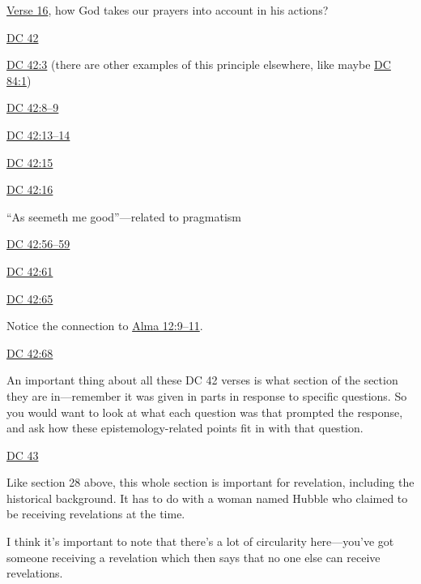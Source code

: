 \begin{compactdesc}
\begin{compactitem}
					\item \hyperref[DC39-16]{Verse 16}, how God takes our prayers into account in his actions?
				\end{compactitem}
			\item \hyperref[DC42]{DC 42}
				\begin{compactitem}
					\item \hyperref[DC42-3]{DC 42:3} (there are other examples of this principle elsewhere, like maybe \hyperref[DC84-1]{DC 84:1})
					\item \hyperref[DC42-8]{DC 42:8--9}
					\item \hyperref[DC42-13]{DC 42:13--14}
					\item \hyperref[DC42-15]{DC 42:15}
					\item \hyperref[DC42-16]{DC 42:16}
						\begin{compactitem}
							\item ``As seemeth me good''---related to pragmatism
						\end{compactitem}
					\item \hyperref[DC42-56]{DC 42:56--59}
					\item \hyperref[DC42-61]{DC 42:61}
					\item \hyperref[DC42-65]{DC 42:65}
						\begin{compactitem}
							\item Notice the connection to \hyperref[ALMA-12-9]{Alma 12:9--11}.
						\end{compactitem}
					\item \hyperref[DC42-68]{DC 42:68}
					\item An important thing about all these DC 42 verses is what section of the section they are in---remember it was given in parts in response to specific questions. So you would want to look at what each question was that prompted the response, and ask how these epistemology-related points fit in with that question.
				\end{compactitem}
			\item \hyperref[DC43]{DC 43}
				\begin{compactitem}
					\item Like section 28 above, this whole section is important for revelation, including the historical background. It has to do with a woman named Hubble who claimed to be receiving revelations at the time.
					\item I think it's important to note that there's a lot of circularity here---you've got someone receiving a revelation which then says that no one else can receive revelations.

\end{compactitem}
\end{compactdesc}
